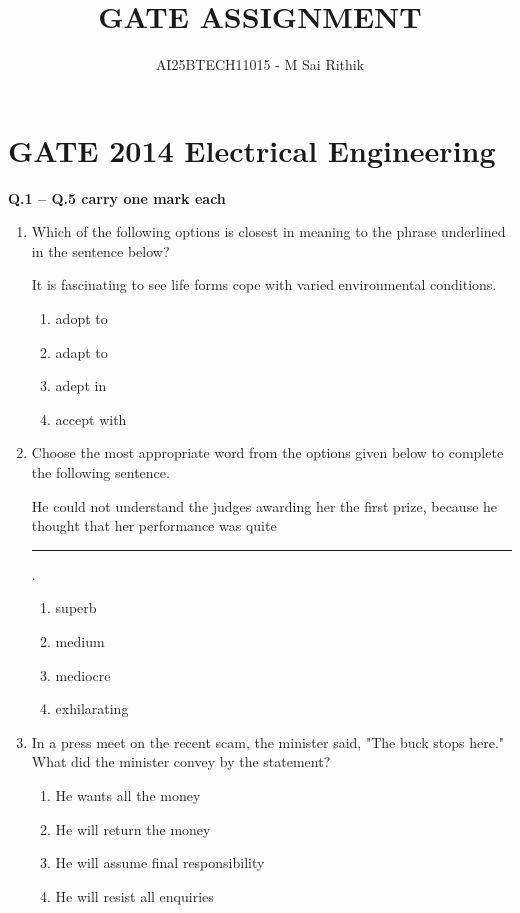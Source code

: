 \documentclass[journal,12pt,onecolumn]{IEEEtran}
\begin{document}
\title{
GATE ASSIGNMENT}
\author{AI25BTECH11015 - M Sai Rithik}
\maketitle

\vspace{1cm}

\section*{GATE 2014 Electrical Engineering\\}

\textbf{Q.1 -- Q.5 carry one mark each}

\begin{enumerate}[label=Q\arabic*:, leftmargin=*, itemindent=0pt]

\item Which of the following options is closest in meaning to the phrase underlined in the sentence below?

It is fascinating to see life forms cope with varied environmental conditions.

\begin{enumerate}[label=(\Alph*), nosep]
\item adopt to
\item adapt to
\item adept in
\item accept with
\end{enumerate}

\item Choose the most appropriate word from the options given below to complete the following sentence.

He could not understand the judges awarding her the first prize, because he thought that her performance was quite \rule{3cm}{0.15mm}.

\begin{enumerate}[label=(\Alph*), nosep]
\item superb
\item medium
\item mediocre
\item exhilarating
\end{enumerate}

\item In a press meet on the recent scam, the minister said, "The buck stops here." What did the minister convey by the statement?

\begin{enumerate}[label=(\Alph*), nosep]
\item He wants all the money
\item He will return the money
\item He will assume final responsibility
\item He will resist all enquiries
\end{enumerate}


\end{enumerate}
\end{document}
